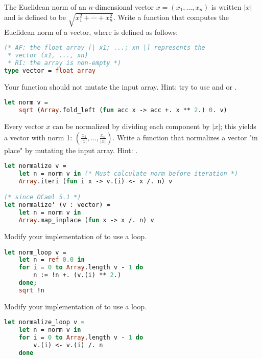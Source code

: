 \problem[norm]
The Euclidean norm of an $n$-dimensional vector $x = (x_1, \ldots, x_n)$ is written $|x|$ and is defined to be $\sqrt{x_1^2 + \cdots + x_n^2}$.
Write a function  that computes the Euclidean norm of a vector, where  is defined as follows:
\begin{lstlisting}[language=OCaml]
(* AF: the float array [| x1; ...; xn |] represents the
 * vector (x1, ..., xn)
 * RI: the array is non-empty *)
type vector = float array
\end{lstlisting}
Your function should not mutate the input array. Hint: try to use  and  or .

\begin{lstlisting}[language=OCaml]
let norm v =
	sqrt (Array.fold_left (fun acc x -> acc +. x ** 2.) 0. v)
\end{lstlisting}

\problem[normalize]
Every vector $x$ can be normalized by dividing each component by $|x|$; this yields a vector with norm 1: $(\frac{x_1}{|x|}, \ldots, \frac{x_n}{|x|})$.
Write a function  that normalizes a vector "in place" by mutating the input array. Hint: .

\begin{lstlisting}[language=OCaml]
let normalize v =
	let n = norm v in (* Must calculate norm before iteration *)
	Array.iteri (fun i x -> v.(i) <- x /. n) v

(* since OCaml 5.1 *)
let normalize' (v : vector) =
	let n = norm v in
	Array.map_inplace (fun x -> x /. n) v
\end{lstlisting}

Modify your implementation of  to use a loop.

\begin{lstlisting}[language=OCaml]
let norm_loop v =
	let n = ref 0.0 in
	for i = 0 to Array.length v - 1 do
		n := !n +. (v.(i) ** 2.)
	done;
	sqrt !n
\end{lstlisting}

Modify your implementation of  to use a loop.

\begin{lstlisting}[language=OCaml]
let normalize_loop v =
	let n = norm v in
	for i = 0 to Array.length v - 1 do
		v.(i) <- v.(i) /. n
	done
\end{lstlisting}

